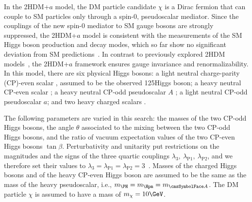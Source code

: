 In the 2HDM+$a$ model, the DM particle candidate $\chi$ is a Dirac fermion that can couple to SM particles only through a spin-0, pseudoscalar mediator. Since the couplings of the new spin-0
mediator to SM gauge bosons are strongly suppressed, the 2HDM+$a$ model
is consistent with the measurements of the SM Higgs boson production and
decay modes, which so far show no significant deviation from SM predictions~\cite{Khachatryan:2016vau}. In contrast to previously explored 2HDM models~\cite{2HDM,Aaboud:2017yqz,Sirunyan:2017hnk}, the 2HDM+$a$ framework ensures gauge invariance and renormalizability. In this model, there are six physical Higgs bosons:
a light neutral charge-parity (CP)-even scalar \Ph, assumed to be the
observed 125\GeV Higgs boson; a heavy neutral CP-even scalar \PH;
a heavy neutral CP-odd pseudoscalar $A$%
; a light neutral CP-odd pseudoscalar $a$; and two heavy charged scalars \Hpm. 


The following parameters are varied in this search: the masses of the
two CP-odd Higgs bosons, the angle $\theta$ associated to the mixing
between the two CP-odd Higgs bosons, and the ratio of vacuum
expectation values of the two CP-even Higgs bosons $\tan\beta$.
Perturbativity and unitarity put restrictions on the magnitudes and the
signs of the three quartic couplings
$\lambda_3,~\lambda_{\mathrm{P}1},~\lambda_{\mathrm{P}2}$,
and we therefore set their values to $\lambda_3=\lambda_{\mathrm{P}1}=\lambda_{\mathrm{P}2}=3$~\cite{Bauer2017}. Masses of the charged Higgs bosons and of the heavy CP-even Higgs boson are assumed to be the same as the mass of the heavy pseudoscalar, i.e., $m_{\PH}=m_{\Hpm}=m_{\Az}$. The DM particle $\chi$ is assumed to have a mass of $m_\chi=10\GeV$.


